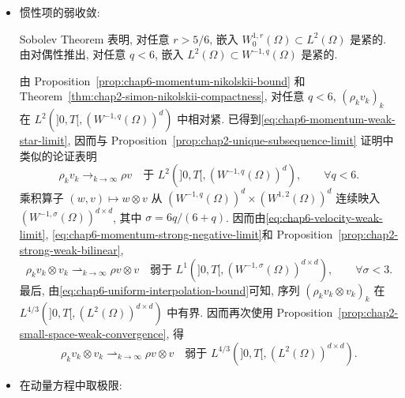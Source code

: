 \begin{sloppypar}
\begin{itemize}
 \item 惯性项的弱收敛:

 Sobolev Theorem 表明, 对任意 $r>5/6$, 嵌入 $W_0^{1,r}(\Omega)\subset L^2(\Omega)$ 是紧的. 由对偶性推出, 对任意 $q<6$, 嵌入 $L^2(\Omega)\subset W^{-1,q}(\Omega)$ 是紧的.

 由 Proposition~\ref{prop:chap6-momentum-nikolskii-bound} 和 Theorem~\ref{thm:chap2-simon-nikolskii-compactness}, 对任意 $q<6$, $(\rho_kv_k)_k$ 在 $L^2(]0,T[,(W^{-1,q}(\Omega))^d)$ 中相对紧. 已得到\eqref{eq:chap6-momentum-weak-star-limit}, 因而与 Proposition~\ref{prop:chap2-unique-subsequence-limit} 证明中类似的论证表明
 \begin{equation}
  \rho_kv_k\longrightarrow_{k\to\infty}\rho v
  \quad\text{于 }L^2(]0,T[,(W^{-1,q}(\Omega))^d),
  \qquad\forall q<6.
 \label{eq:chap6-momentum-strong-negative-limit}
 \end{equation}
 乘积算子 $(w,v)\mapsto w\otimes v$ 从
 $(W^{-1,q}(\Omega))^d\times(W^{1,2}(\Omega))^d$ 连续映入
 $(W^{-1,\sigma}(\Omega))^{d\times d}$, 其中
 $\sigma=6q/(6+q)$. 因而由\eqref{eq:chap6-velocity-weak-limit}, \eqref{eq:chap6-momentum-strong-negative-limit}和 Proposition~\ref{prop:chap2-strong-weak-bilinear},
 \[
  \rho_kv_k\otimes v_k\rightharpoonup_{k\to\infty}\rho v\otimes v
  \quad\text{弱于 }L^1(]0,T[,(W^{-1,\sigma}(\Omega))^{d\times d}),
  \qquad\forall\sigma<3.
 \]
 最后, 由\eqref{eq:chap6-uniform-interpolation-bound}可知, 序列 $(\rho_kv_k\otimes v_k)_k$ 在 $L^{4/3}(]0,T[,(L^2(\Omega))^{d\times d})$ 中有界. 因而再次使用 Proposition~\ref{prop:chap2-small-space-weak-convergence}, 得
 \[
 \rho_kv_k\otimes v_k\rightharpoonup_{k\to\infty}\rho v\otimes v
 \quad\text{弱于 }L^{4/3}(]0,T[,(L^2(\Omega))^{d\times d}).
 \]

 \item 在动量方程中取极限:


\end{itemize}
\end{sloppypar}
